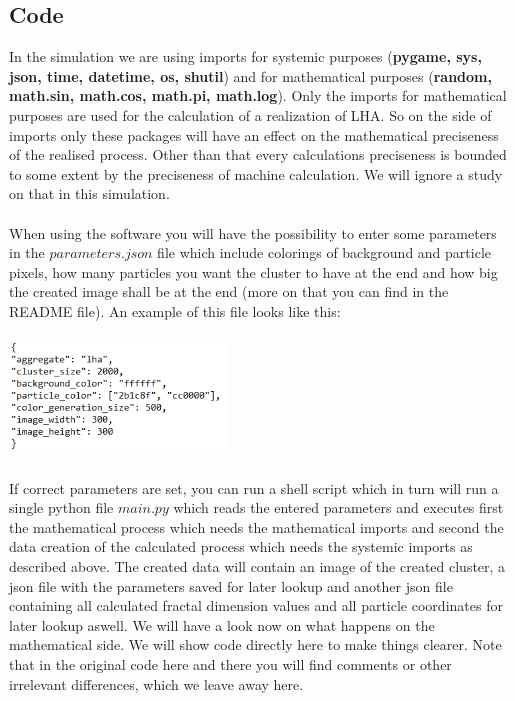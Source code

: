 \documentclass[12pt,a4paper]{scrartcl}
\numberwithin{equation}{subsection}
\newcommand{\1}{\mathbbm{1}}
\numberwithin{equation}{section}
\theoremstyle{definition}
\begin{document}
\subsection{Code}
In the simulation we are using imports for systemic purposes (\textbf{pygame, sys, json, time, datetime, os, shutil}) and for mathematical purposes (\textbf{random, math.sin, math.cos, math.pi, math.log}). Only the imports for mathematical purposes are used for the calculation of a realization of LHA. So on the side of imports only these packages will have an effect on the mathematical preciseness of the realised process. Other than that every calculations preciseness is bounded to some extent by the preciseness of machine calculation. We will ignore a study on that in this simulation. \\
\\When using the software you will have the possibility to enter some parameters in the $\mathit{parameters.json}$ file which include colorings of background and particle pixels, how many particles you want the cluster to have at the end and how big the created image shall be at the end (more on that you can find in the README file). An example of this file looks like this:\\
\\
\includegraphics[height=3cm]{images/code-snippets/parameters.png} \\
\\
If correct parameters are set, you can run a shell script which in turn will run a single python file $\mathit{main.py}$ which reads the entered parameters and executes first the mathematical process which needs the mathematical imports and second the data creation of the calculated process which needs the systemic imports as described above. The created data will contain an image of the created cluster, a json file with the parameters saved for later lookup and another json file containing all calculated fractal dimension values and all particle coordinates for later lookup aswell. We will have a look now on what happens on the mathematical side. We will show code directly here to make things clearer. Note that in the original code here and there you will find comments or other irrelevant differences, which we leave away here. \\
\end{document}
